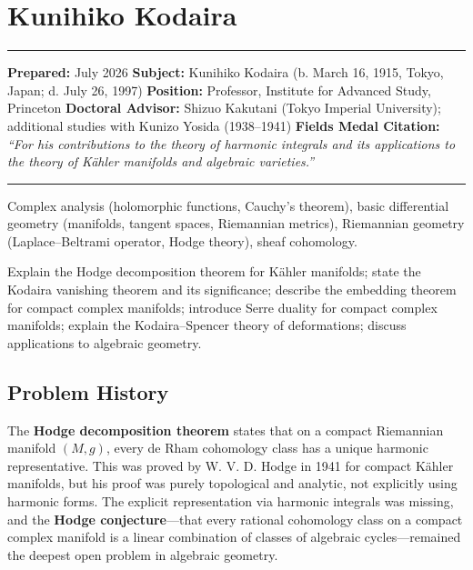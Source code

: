 \chapter{Kunihiko Kodaira}\label{ch1954kunihiko_kodaira:kunihiko-kodaira-fields-medal-1954-a-comprehensive-report}

\begin{center}\rule{0.5\linewidth}{0.5pt}\end{center}

\textbf{Prepared:} July 2026 \textbf{Subject:} Kunihiko Kodaira
(b. March 16, 1915, Tokyo, Japan; d. July 26, 1997)
\textbf{Position:} Professor, Institute for Advanced Study, Princeton
\textbf{Doctoral Advisor:} Shizuo Kakutani (Tokyo Imperial University);
additional studies with Kunizo Yosida (1938--1941)
\textbf{Fields Medal Citation:} \emph{``For his contributions to the
theory of harmonic integrals and its applications to the theory of
K{\"a}hler manifolds and algebraic varieties.''}

\begin{center}\rule{0.5\linewidth}{0.5pt}\end{center}

\begin{prereqs}
Complex analysis (holomorphic functions, Cauchy's theorem),
basic differential geometry (manifolds, tangent spaces, Riemannian metrics),
Riemannian geometry (Laplace--Beltrami operator, Hodge theory),
sheaf cohomology.
\end{prereqs}

\begin{objectives}
Explain the Hodge decomposition theorem for K{\"a}hler manifolds;
state the Kodaira vanishing theorem and its significance;
describe the embedding theorem for compact complex manifolds;
introduce Serre duality for compact complex manifolds;
explain the Kodaira--Spencer theory of deformations;
discuss applications to algebraic geometry.
\end{objectives}

\section{Problem History}

The \textbf{Hodge decomposition theorem} states that on a compact
Riemannian manifold $(M, g)$, every de Rham cohomology class has a
unique harmonic representative. This was proved by W. V. D. Hodge in
1941 for compact K{\"a}hler manifolds, but his proof was purely
topological and analytic, not explicitly using harmonic forms. The
explicit representation via harmonic integrals was missing, and the
\textbf{Hodge conjecture}---that every rational cohomology class on a
compact complex manifold is a linear combination of classes of algebraic
cycles---remained the deepest open problem in algebraic geometry.

